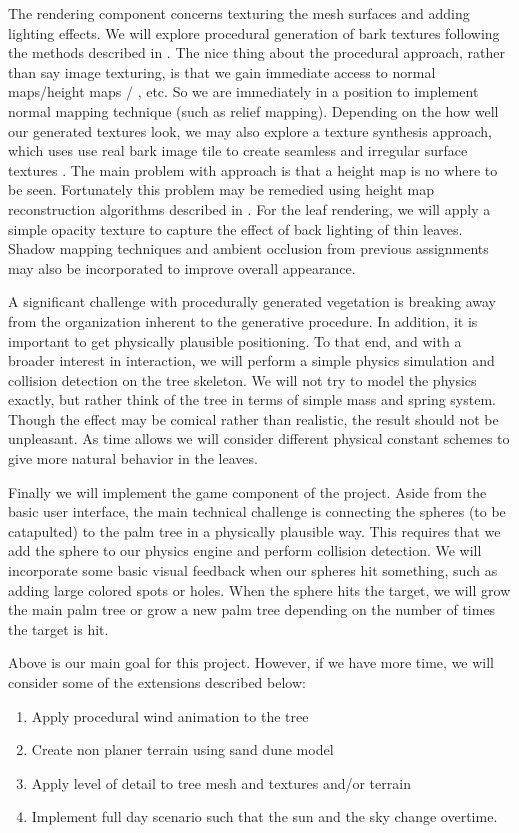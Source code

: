 \documentclass[annual]{acmsiggraph}
\begin{document}
The rendering component concerns texturing the mesh surfaces and adding lighting effects.  We will  explore  procedural  generation of bark textures following the methods described in \cite{elbert2002}.  The nice thing about the procedural approach, rather than say image texturing, is that we gain immediate access to normal maps/height maps / , etc.  So we are immediately in a position to implement  normal mapping technique (such as relief mapping).  Depending on the how well our generated textures look, we may also explore a texture synthesis approach, which uses use real bark image tile to create seamless and irregular surface textures \cite{ashikhmin2001}.   The main problem with approach is that a height map is no where to be seen.  Fortunately this problem may be remedied using height map reconstruction algorithms described in \cite{wang2003}.   For the leaf rendering, we will apply a simple opacity texture to capture the effect of back lighting of thin leaves.  Shadow mapping techniques and ambient occlusion from previous assignments may also be incorporated to improve overall appearance.  

A significant challenge with procedurally generated vegetation is breaking away from the organization inherent to the generative procedure.  In addition, it is important to get physically plausible positioning.  To that end, and with a broader interest in interaction,  we will perform a simple physics simulation and collision detection on the tree skeleton.   We will not try to model the physics exactly, but rather think of the tree in terms of simple mass and spring system.  Though the effect may be comical rather than realistic, the result should not be unpleasant.  As time allows we will consider different physical constant schemes to give more natural behavior in the leaves.   

Finally we will implement the game component of the project.  Aside from the basic user interface, the main technical challenge is connecting the spheres (to be catapulted)  to the palm tree in a physically plausible way.  This requires that we add the sphere to our physics engine and perform collision detection.    We will incorporate some basic visual feedback when our spheres hit something, such as adding large colored spots or holes. When the sphere hits the target, we will grow the main palm tree or grow a new palm tree depending on the number of times the target is hit.

Above is our main goal for this project. However, if we have more time, we will consider some of the extensions described below:
\begin{enumerate}
\item{Apply procedural wind animation to the tree  \cite{renaldas2008}  }
\item{Create non planer terrain using sand dune model \cite{momiji2002}}
\item{Apply level of detail to tree mesh and textures and/or terrain}
\item{Implement full day scenario such that the sun and the sky change overtime.}
\end{enumerate}
\end{document}
